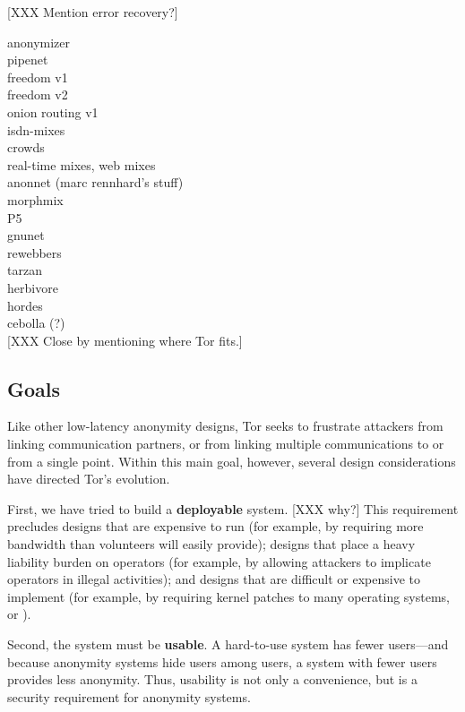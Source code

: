\documentclass[times,10pt,twocolumn]{article}
\begin{document}
[XXX Mention error recovery?]



anonymizer\\
pipenet\\
freedom v1\\
freedom v2\\
onion routing v1\\
isdn-mixes\\
crowds\\
real-time mixes, web mixes\\
anonnet (marc rennhard's stuff)\\
morphmix\\
P5\\
gnunet\\
rewebbers\\
tarzan\\
herbivore\\
hordes\\
cebolla (?)\\

[XXX Close by mentioning where Tor fits.]

\label{sec:assumptions}


\subsection{Goals}
Like other low-latency anonymity designs, Tor seeks to frustrate
attackers from linking communication partners, or from linking
multiple communications to or from a single point.  Within this
main goal, however, several design considerations have directed
Tor's evolution.

First, we have tried to build a {\bf deployable} system.  [XXX why?]
This requirement precludes designs that are expensive to run (for
example, by requiring more bandwidth than volunteers will easily
provide); designs that place a heavy liability burden on operators
(for example, by allowing attackers to implicate operators in illegal
activities); and designs that are difficult or expensive to implement
(for example, by requiring kernel patches to many operating systems,
or ).

Second, the system must be {\bf usable}.  A hard-to-use system has
fewer users---and because anonymity systems hide users among users, a
system with fewer users provides less anonymity.  Thus, usability is
not only a convenience, but is a security requirement for anonymity
systems.
\end{document}
